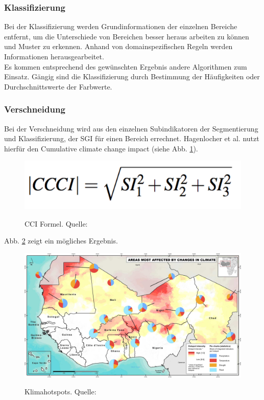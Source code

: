 \documentclass[10pt,conference,compsocconf]{IEEEtran}
\begin{document}
\subsubsection{Klassifizierung}
Bei der Klassifizierung werden Grundinformationen der einzelnen Bereiche entfernt, um die Unterschiede von Bereichen besser heraus arbeiten zu können und Muster zu erkennen. Anhand von domainspezifischen Regeln werden Informationen herausgearbeitet.\\
Es kommen entsprechend des gewünschten Ergebnis andere Algorithmen zum Einsatz. Gängig sind die Klassifizierung durch Bestimmung der Häufigkeiten oder Durchschnittswerte der Farbwerte.


\subsubsection{Verschneidung}
Bei der Verschneidung wird aus den einzelnen Subindikatoren der Segmentierung und Klassifizierung, der SGI für einen Bereich errechnet. Hagenlocher et al. \cite{hagenlocher2014modeling} nutzt hierfür den Cumulative climate change impact (siehe Abb. \ref{img:CCI_Formel}).
\begin{figure}[H]
	\centering
	\includegraphics[width=0.5\columnwidth]{img/CCI_Formel.png} \\
	\caption[]{CCI Formel. Quelle: \cite{hagenlocher2014modeling}}
	\label{img:CCI_Formel}
\end{figure}

Abb. \ref{img:Klimahotspots} zeigt ein mögliches Ergebnis.

\begin{figure}[H]
	\centering
	\includegraphics[width=1\columnwidth]{img/climate_hotspots.png} \\
	\caption[]{Klimahotspots. Quelle: }
	\label{img:Klimahotspots}
\end{figure}
\end{document}
